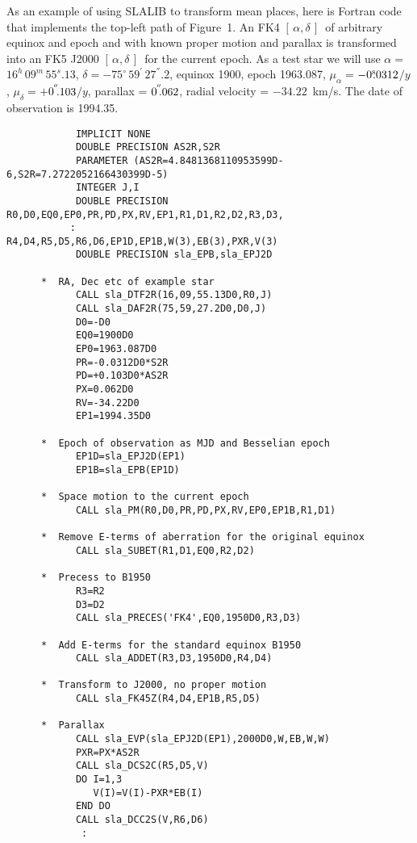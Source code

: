 \documentclass[11pt,twoside]{article}
\newcommand{\radec}     {$[\,\alpha,\delta\,]$}
\newcommand{\arcsec}[2] {\arcseci{#1}$\hspace{-0.4em}.#2$}
\newcommand{\arcsec}[2] {
      {$#1\hspace{-0.05em}^{'\hspace{-0.1em}'}\hspace{-0.4em}.#2$}
   }
\newcommand{\arcseci}[1] {$#1\hspace{-0.05em}$\raisebox{-0.5ex}
                         {$^{'\hspace{-0.1em}'}$}}
\renewcommand{\arcseci}[1] {$#1\hspace{-0.05em}^{'\hspace{-0.1em}'}$}
\newcommand{\dms}[4]    {$#1^{\circ}\,#2\raisebox{-0.5ex}
                        {$^{'}$}\,$\arcsec{#3}{#4}}
\renewcommand{\dms}[4]{$#1^{\circ}\,#2^{'}\,#3^{''}.#4$}
\newcommand{\tseci}[1]   {$#1$\mbox{$^{\rm s}$}}
\newcommand{\tsec}[2]    {\tseci{#1}$\hspace{-0.3em}.#2$}
\renewcommand{\tsec}[2] {$#1^{\rm s}\hspace{-0.3em}.#2$}
\newcommand{\hms}[4]    {$#1^{\rm h}\,#2^{\rm m}\,$\tsec{#3}{#4}}
\renewcommand{\hms}[4] {$#1^{h}\,#2^{m}\,#3^{s}.#4$}
\begin{document}
As an example of using SLALIB to transform mean places, here is
Fortran code that implements the top-left path of Figure~1.
An FK4 \radec\ of arbitrary equinox and epoch and with
known proper motion and
parallax is transformed into an FK5 J2000 \radec\ for the current
epoch.  As a test star we will use $\alpha=$\hms{16}{09}{55}{13},
$\delta=$\dms{-75}{59}{27}{2}, equinox 1900, epoch 1963.087,
$\mu_\alpha=$\tsec{-0}{0312}$/y$, $\mu_\delta=$\arcsec{+0}{103}$/y$,
parallax = \arcsec{0}{062}, radial velocity = $-34.22$~km/s.  The
date of observation is 1994.35.
\goodbreak
\begin{verbatim}
            IMPLICIT NONE
            DOUBLE PRECISION AS2R,S2R
            PARAMETER (AS2R=4.8481368110953599D-6,S2R=7.2722052166430399D-5)
            INTEGER J,I
            DOUBLE PRECISION R0,D0,EQ0,EP0,PR,PD,PX,RV,EP1,R1,D1,R2,D2,R3,D3,
           :                 R4,D4,R5,D5,R6,D6,EP1D,EP1B,W(3),EB(3),PXR,V(3)
            DOUBLE PRECISION sla_EPB,sla_EPJ2D

      *  RA, Dec etc of example star
            CALL sla_DTF2R(16,09,55.13D0,R0,J)
            CALL sla_DAF2R(75,59,27.2D0,D0,J)
            D0=-D0
            EQ0=1900D0
            EP0=1963.087D0
            PR=-0.0312D0*S2R
            PD=+0.103D0*AS2R
            PX=0.062D0
            RV=-34.22D0
            EP1=1994.35D0

      *  Epoch of observation as MJD and Besselian epoch
            EP1D=sla_EPJ2D(EP1)
            EP1B=sla_EPB(EP1D)

      *  Space motion to the current epoch
            CALL sla_PM(R0,D0,PR,PD,PX,RV,EP0,EP1B,R1,D1)

      *  Remove E-terms of aberration for the original equinox
            CALL sla_SUBET(R1,D1,EQ0,R2,D2)

      *  Precess to B1950
            R3=R2
            D3=D2
            CALL sla_PRECES('FK4',EQ0,1950D0,R3,D3)

      *  Add E-terms for the standard equinox B1950
            CALL sla_ADDET(R3,D3,1950D0,R4,D4)

      *  Transform to J2000, no proper motion
            CALL sla_FK45Z(R4,D4,EP1B,R5,D5)

      *  Parallax
            CALL sla_EVP(sla_EPJ2D(EP1),2000D0,W,EB,W,W)
            PXR=PX*AS2R
            CALL sla_DCS2C(R5,D5,V)
            DO I=1,3
               V(I)=V(I)-PXR*EB(I)
            END DO
            CALL sla_DCC2S(V,R6,D6)
             :
\end{verbatim}
\end{document}
